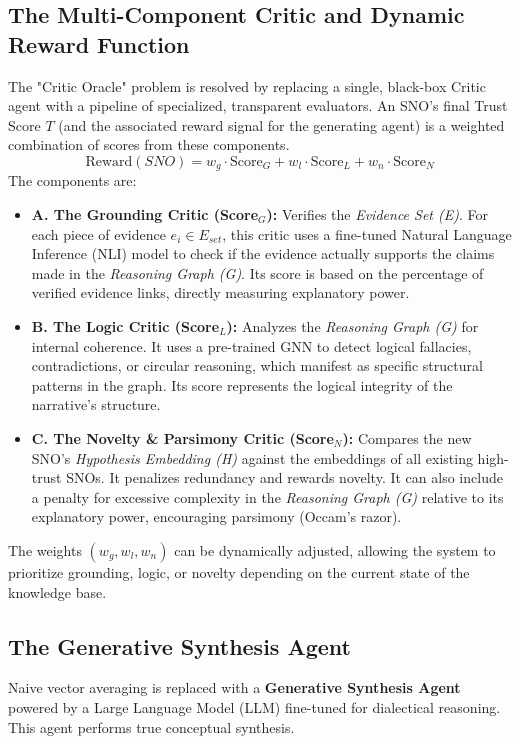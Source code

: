 \documentclass[12pt, a4paper]{article}
\begin{document}
\subsection{The Multi-Component Critic and Dynamic Reward Function}
The "Critic Oracle" problem is resolved by replacing a single, black-box Critic agent with a pipeline of specialized, transparent evaluators. An SNO's final Trust Score $T$ (and the associated reward signal for the generating agent) is a weighted combination of scores from these components.
\begin{equation}
\text{Reward}(SNO) = w_g \cdot \text{Score}_G + w_l \cdot \text{Score}_L + w_n \cdot \text{Score}_N
\end{equation}
The components are:
\begin{itemize}
    \item \textbf{A. The Grounding Critic (Score$_G$):} Verifies the \textit{Evidence Set (E)}. For each piece of evidence $e_i \in E_{set}$, this critic uses a fine-tuned Natural Language Inference (NLI) model to check if the evidence actually supports the claims made in the \textit{Reasoning Graph (G)}. Its score is based on the percentage of verified evidence links, directly measuring explanatory power.
    \item \textbf{B. The Logic Critic (Score$_L$):} Analyzes the \textit{Reasoning Graph (G)} for internal coherence. It uses a pre-trained GNN to detect logical fallacies, contradictions, or circular reasoning, which manifest as specific structural patterns in the graph. Its score represents the logical integrity of the narrative's structure.
    \item \textbf{C. The Novelty \& Parsimony Critic (Score$_N$):} Compares the new SNO's \textit{Hypothesis Embedding (H)} against the embeddings of all existing high-trust SNOs. It penalizes redundancy and rewards novelty. It can also include a penalty for excessive complexity in the \textit{Reasoning Graph (G)} relative to its explanatory power, encouraging parsimony (Occam's razor).
\end{itemize}
The weights $(w_g, w_l, w_n)$ can be dynamically adjusted, allowing the system to prioritize grounding, logic, or novelty depending on the current state of the knowledge base.

\subsection{The Generative Synthesis Agent}
Naive vector averaging is replaced with a \textbf{Generative Synthesis Agent} powered by a Large Language Model (LLM) fine-tuned for dialectical reasoning. This agent performs true conceptual synthesis.
\end{document}
